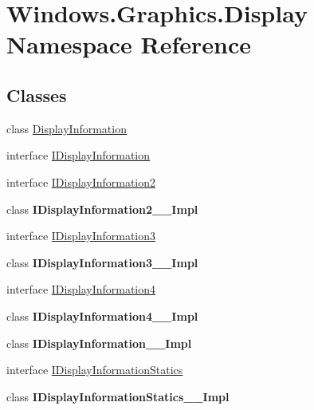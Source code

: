 \hypertarget{namespace_windows_1_1_graphics_1_1_display}{}\section{Windows.\+Graphics.\+Display Namespace Reference}
\label{namespace_windows_1_1_graphics_1_1_display}
\subsection*{Classes}
\begin{DoxyCompactItemize}
\item 
class \hyperlink{class_windows_1_1_graphics_1_1_display_1_1_display_information}{Display\+Information}
\item 
interface \hyperlink{interface_windows_1_1_graphics_1_1_display_1_1_i_display_information}{I\+Display\+Information}
\item 
interface \hyperlink{interface_windows_1_1_graphics_1_1_display_1_1_i_display_information2}{I\+Display\+Information2}
\item 
class {\bfseries I\+Display\+Information2\+\_\+\+\_\+\+Impl}
\item 
interface \hyperlink{interface_windows_1_1_graphics_1_1_display_1_1_i_display_information3}{I\+Display\+Information3}
\item 
class {\bfseries I\+Display\+Information3\+\_\+\+\_\+\+Impl}
\item 
interface \hyperlink{interface_windows_1_1_graphics_1_1_display_1_1_i_display_information4}{I\+Display\+Information4}
\item 
class {\bfseries I\+Display\+Information4\+\_\+\+\_\+\+Impl}
\item 
class {\bfseries I\+Display\+Information\+\_\+\+\_\+\+Impl}
\item 
interface \hyperlink{interface_windows_1_1_graphics_1_1_display_1_1_i_display_information_statics}{I\+Display\+Information\+Statics}
\item 
class {\bfseries I\+Display\+Information\+Statics\+\_\+\+\_\+\+Impl}
\end{DoxyCompactItemize}
